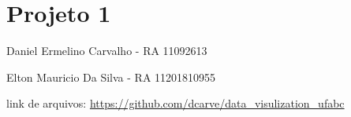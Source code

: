 





\frenchspacing 


\textual

	

	\chapter{Projeto 1}
		Daniel Ermelino Carvalho - RA 11092613
		
		Elton Mauricio Da Silva - RA 11201810955

		link de arquivos: \url{https://github.com/dcarve/data_visulization_ufabc}
	
	

	

	



\printindex




